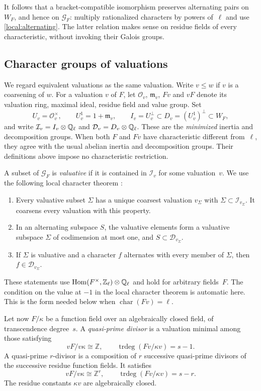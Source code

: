 It follows that a bracket-compatible isomorphism preserves alternating
pairs on $W_F$, and hence on $\mathcal G_F$: multiply rationalized
characters by powers of~$\ell$ and use
\eqref{local:alternating}.  The latter relation makes sense on residue
fields of every characteristic, without invoking their Galois groups.

\subsection{Character groups of valuations}

We regard equivalent valuations as the same valuation.  Write $v\leq w$
if $v$ is a coarsening of $w$.  For a valuation $v$ of $F$, let
$\mathcal O_v$, $\mathfrak m_v$, $Fv$ and $vF$ denote its valuation
ring, maximal ideal, residue field and value group.  Set
\[
 U_v=\mathcal O_v^\times,\qquad U_v^1=1+\mathfrak m_v,
 \qquad I_v=U_v^\perp\subset D_v=(U_v^1)^\perp\subset W_F,
\]
and write $\mathcal I_v=I_v\otimes\mathbb Q_\ell$ and
$\mathcal D_v=D_v\otimes\mathbb Q_\ell$.
These are the \emph{minimized} inertia and decomposition groups.
When both $F$ and $Fv$ have characteristic different from~$\ell$,
they agree with the usual abelian inertia and decomposition groups.
Their definitions above impose no characteristic restriction.

A subset of $\mathcal G_F$ is \emph{valuative} if it is contained in
$\mathcal I_v$ for some valuation~$v$.
We use the following local character theorem
\cite[Fact~2.1, Lemma~2.5 and Corollary~2.7]{Topaz2019}:
\begin{enumerate}
 \item Every valuative subset $\Sigma$ has a unique coarsest
 valuation $v_\Sigma$ with $\Sigma\subset\mathcal I_{v_\Sigma}$.
 It coarsens every valuation with this property.
 \item In an alternating subspace $S$, the valuative elements form
 a valuative subspace $\Sigma$ of codimension at most one, and
 $S\subset\mathcal D_{v_\Sigma}$.
 \item If $\Sigma$ is valuative and a character $f$ alternates with
 every member of $\Sigma$, then $f\in\mathcal D_{v_\Sigma}$.
\end{enumerate}
These statements use $\operatorname{Hom}(F^\times,\mathbb Z_\ell)\otimes\mathbb Q_\ell$
and hold for arbitrary fields~$F$.  The condition on the value at $-1$
in the local character theorem is automatic here.  This is the form
needed below when $\operatorname{char}(Fv)=\ell$.

Let now $F/\kappa$ be a function field over an algebraically closed
field, of transcendence degree~$s$.  A \emph{quasi-prime divisor} is a
valuation minimal among those satisfying
\[
 vF/v\kappa\cong\mathbb Z,
 \qquad \operatorname{trdeg}(Fv/\kappa v)=s-1.
\]
A quasi-prime $r$-divisor is a composition of $r$ successive
quasi-prime divisors of the successive residue function fields.  It
satisfies
\begin{equation}\label{local:rank}
 vF/v\kappa\cong\mathbb Z^r,
 \qquad \operatorname{trdeg}(Fv/\kappa v)=s-r.
\end{equation}
The residue constants $\kappa v$ are algebraically closed.

